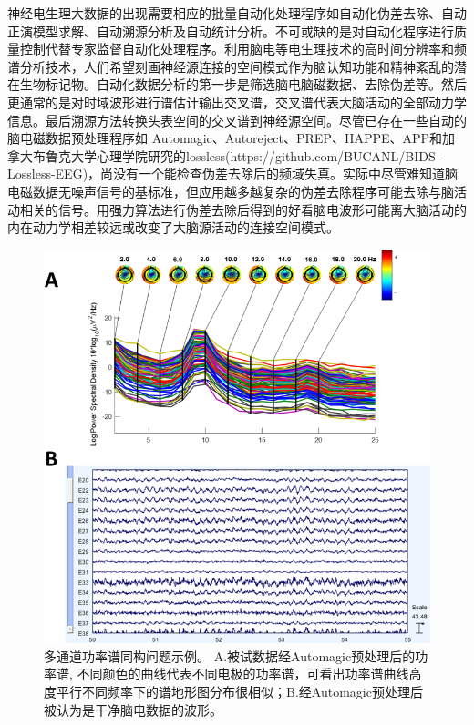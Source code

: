 神经电生理大数据的出现需要相应的批量自动化处理程序如自动化伪差去除、自动正演模型求解、自动溯源分析及自动统计分析。不可或缺的是对自动化程序进行质量控制代替专家监督自动化处理程序。利用脑电等电生理技术的高时间分辨率和频谱分析技术，人们希望刻画神经源连接的空间模式作为脑认知功能和精神紊乱的潜在生物标记物。自动化数据分析的第一步是筛选脑电脑磁数据、去除伪差等。然后更通常的是对时域波形进行谱估计输出交叉谱，交叉谱代表大脑活动的全部动力学信息。最后溯源方法转换头表空间的交叉谱到神经源空间。尽管已存在一些自动的脑电磁数据预处理程序如
Automagic、Autoreject、PREP、HAPPE、APP和加拿大布鲁克大学心理学院研究的lossless(https://github.com/BUCANL/BIDS-Lossless-EEG)，尚没有一个能检查伪差去除后的频域失真。实际中尽管难知道脑电磁数据无噪声信号的基标准，但应用越多越复杂的伪差去除程序可能去除与脑活动相关的信号。用强力算法进行伪差去除后得到的好看脑电波形可能离大脑活动的内在动力学相差较远或改变了大脑源活动的连接空间模式。
\begin{figure}[!h]
\includegraphics[width=15cm]{pic/palos/issue.png}
\caption{多通道功率谱同构问题示例。 A.被试数据经Automagic预处理后的功率谱, 不同颜色的曲线代表不同电极的功率谱，可看出功率谱曲线高度平行不同频率下的谱地形图分布很相似；B.经Automagic预处理后被认为是干净脑电数据的波形。}
\label{5:issue}
\end{figure}


